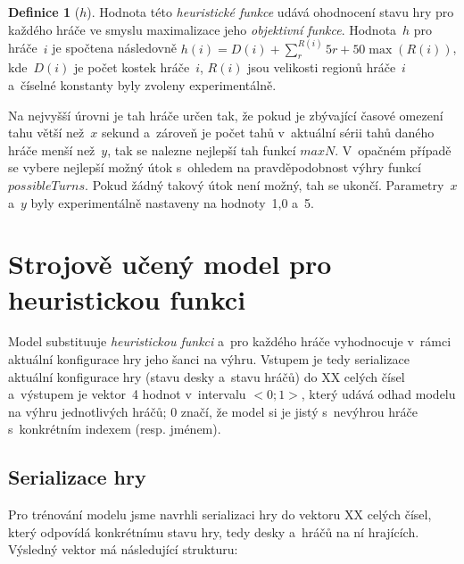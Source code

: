\documentclass[11pt, a4paper]{article}
\theoremstyle{definition}
\newtheorem{definition}{Definice}[section]
\begin{document}
\medskip

\begin{definition}[$ h $]
\label{def:h}
Hodnota této \emph{heuristické funkce} udává ohodnocení stavu hry pro
každého hráče ve smyslu maximalizace jeho \emph{objektivní funkce}.
Hodnota~$ h $ pro hráče~$ i $ je spočtena následovně $ h(i) = D(i) +
\sum_r^{R(i)} 5 r + 50 \max (R(i)) $, kde~$ D(i) $ je počet kostek
hráče~$ i $, $ R(i) $ jsou velikosti regionů hráče~$ i $ a~číselné konstanty
byly zvoleny experimentálně.
\end{definition}

Na nejvyšší úrovni je tah hráče určen tak, že pokud je zbývající časové
omezení tahu větší než~$ x $ sekund a~zároveň je počet tahů v~aktuální sérii
tahů daného hráče menší než~$ y $, tak se nalezne nejlepší tah funkcí
$ maxN $. V~opačném případě se vybere nejlepší možný útok s~ohledem na
pravděpodobnost výhry funkcí $ possibleTurns $. Pokud žádný takový útok
není možný, tah se ukončí. Parametry~$ x $ a~$ y $ byly experimentálně
nastaveny na hodnoty~1,0 a~5.


\section{Strojově učený model pro heuristickou funkci}
\label{sec:aiMl}

Model substituuje \emph{heuristickou funkci} a~pro každého hráče vyhodnocuje v~rámci aktuální konfigurace hry jeho šanci na výhru.
Vstupem je tedy serializace aktuální konfigurace hry (stavu desky a~stavu hráčů) do XX celých čísel a~výstupem je vektor~4 hodnot v~intervalu $<0;1>$, který udává odhad modelu na výhru jednotlivých hráčů; $0$ značí, že model si je jistý s~nevýhrou hráče s~konkrétním indexem (resp. jménem).

\subsection{Serializace hry}
\label{sec:serialiseGame}

Pro trénování modelu jsme navrhli serializaci hry do vektoru XX celých čísel, který odpovídá konkrétnímu stavu hry, tedy desky a~hráčů na ní hrajících. Výsledný vektor má následující strukturu:
\end{document}
